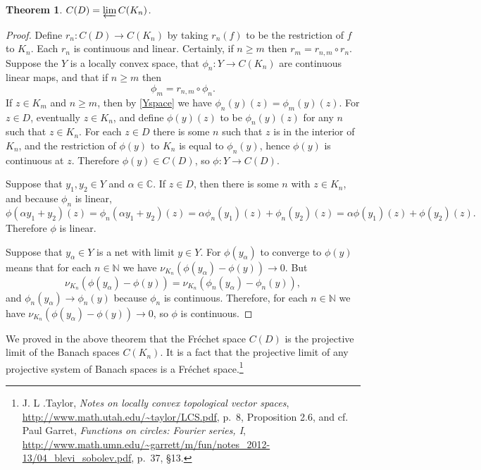 \documentclass{article}
\newtheorem{theorem}{Theorem}
\begin{document}
\begin{theorem}
$C(D)=\varprojlim C(K_n)$.
\end{theorem}
\begin{proof}
Define $r_n:C(D) \to C(K_n)$ by taking $r_n(f)$ to be the restriction of $f$ to $K_n$. Each $r_n$ is continuous and linear. Certainly, if $n \geq m$ then $r_m = r_{n,m} \circ r_n$. 
Suppose the $Y$ is a locally convex space, that $\phi_n:Y \to C(K_n)$ are continuous linear maps, and that if $n \geq m$ then
\begin{equation}
\phi_m = r_{n,m} \circ \phi_n.
\label{Yspace}
\end{equation}
If $z \in K_m$ and $n \geq m$, then by \eqref{Yspace} we have $\phi_n(y)(z)=\phi_m(y)(z)$.
For $z \in D$, eventually $z \in K_n$, and 
define $\phi(y)(z)$ to be $\phi_n(y)(z)$ for any $n$ such that $z \in K_n$. For each $z \in D$ there is some $n$ such that $z$ is in the interior of $K_n$,
and the restriction of $\phi(y)$ to $K_n$ is equal to $\phi_n(y)$, hence $\phi(y)$ is continuous at $z$. Therefore $\phi(y)
\in C(D)$, so $\phi:Y \to C(D)$. 

Suppose that $y_1,y_2 \in Y$ and $\alpha \in \mathbb{C}$. If $z \in D$, 
then there is some $n$ with $z \in K_n$, and because $\phi_n$ is linear,
\[
\phi(\alpha y_1+y_2)(z) = \phi_n(\alpha y_1+y_2)(z)=\alpha \phi_n(y_1)(z)+\phi_n(y_2)(z) = \alpha \phi(y_1)(z)+\phi(y_2)(z).
\]
Therefore $\phi$ is linear. 

Suppose that $y_\alpha \in Y$ is a net with limit $y \in Y$. For $\phi(y_\alpha)$ to converge to $\phi(y)$ means that
for each $n \in \mathbb{N}$ we have $\nu_{K_n}(\phi(y_\alpha)-\phi(y)) \to 0$.  But
\[
\nu_{K_n}(\phi(y_\alpha)-\phi(y)) = \nu_{K_n}(\phi_n(y_\alpha)-\phi_n(y)),
\]
and $\phi_n(y_\alpha) \to \phi_n(y)$ because $\phi_n$ is continuous. Therefore, for each $n \in \mathbb{N}$ we have
$\nu_{K_n}(\phi(y_\alpha)-\phi(y)) \to 0$, so $\phi$ is continuous.
\end{proof}


We proved in the above theorem that the Fr\'echet space $C(D)$ is the projective limit of the Banach spaces $C(K_n)$. It is a fact that 
the projective limit of any projective system of Banach spaces is a Fr\'echet space.\footnote{J. L .Taylor, {\em Notes on locally convex topological vector spaces},
\url{http://www.math.utah.edu/~taylor/LCS.pdf}, p.~8, Proposition 2.6, and
cf. Paul Garret,
{\em Functions on circles: Fourier series, I}, \url{http://www.math.umn.edu/~garrett/m/fun/notes_2012-13/04_blevi_sobolev.pdf}, p.~37, \S 13.}
 
\end{document}
